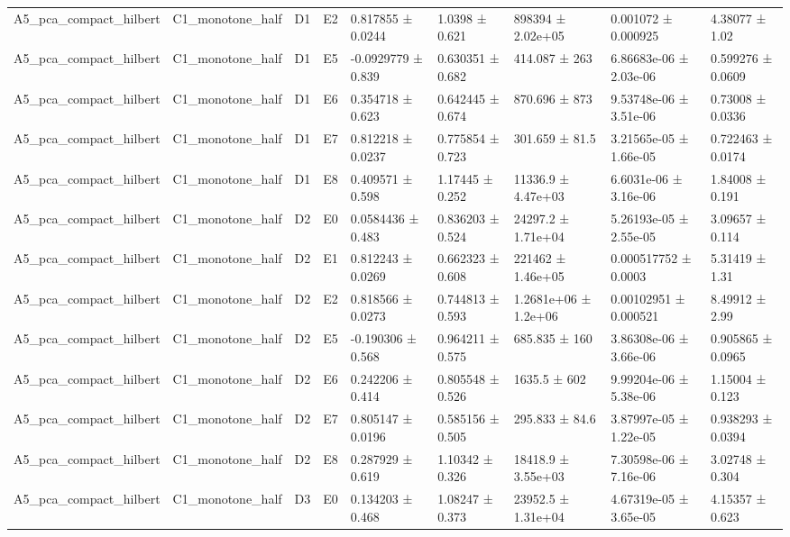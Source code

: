 \begin{table}
\begin{tabular}{lllllllll}
A5\_pca\_compact\_hilbert & C1\_monotone\_half & D1 & E2 & 0.817855 ± 0.0244 & 1.0398 ± 0.621 & 898394 ± 2.02e+05 & 0.001072 ± 0.000925 & 4.38077 ± 1.02 \\
A5\_pca\_compact\_hilbert & C1\_monotone\_half & D1 & E5 & -0.0929779 ± 0.839 & 0.630351 ± 0.682 & 414.087 ± 263 & 6.86683e-06 ± 2.03e-06 & 0.599276 ± 0.0609 \\
A5\_pca\_compact\_hilbert & C1\_monotone\_half & D1 & E6 & 0.354718 ± 0.623 & 0.642445 ± 0.674 & 870.696 ± 873 & 9.53748e-06 ± 3.51e-06 & 0.73008 ± 0.0336 \\
A5\_pca\_compact\_hilbert & C1\_monotone\_half & D1 & E7 & 0.812218 ± 0.0237 & 0.775854 ± 0.723 & 301.659 ± 81.5 & 3.21565e-05 ± 1.66e-05 & 0.722463 ± 0.0174 \\
A5\_pca\_compact\_hilbert & C1\_monotone\_half & D1 & E8 & 0.409571 ± 0.598 & 1.17445 ± 0.252 & 11336.9 ± 4.47e+03 & 6.6031e-06 ± 3.16e-06 & 1.84008 ± 0.191 \\
A5\_pca\_compact\_hilbert & C1\_monotone\_half & D2 & E0 & 0.0584436 ± 0.483 & 0.836203 ± 0.524 & 24297.2 ± 1.71e+04 & 5.26193e-05 ± 2.55e-05 & 3.09657 ± 0.114 \\
A5\_pca\_compact\_hilbert & C1\_monotone\_half & D2 & E1 & 0.812243 ± 0.0269 & 0.662323 ± 0.608 & 221462 ± 1.46e+05 & 0.000517752 ± 0.0003 & 5.31419 ± 1.31 \\
A5\_pca\_compact\_hilbert & C1\_monotone\_half & D2 & E2 & 0.818566 ± 0.0273 & 0.744813 ± 0.593 & 1.2681e+06 ± 1.2e+06 & 0.00102951 ± 0.000521 & 8.49912 ± 2.99 \\
A5\_pca\_compact\_hilbert & C1\_monotone\_half & D2 & E5 & -0.190306 ± 0.568 & 0.964211 ± 0.575 & 685.835 ± 160 & 3.86308e-06 ± 3.66e-06 & 0.905865 ± 0.0965 \\
A5\_pca\_compact\_hilbert & C1\_monotone\_half & D2 & E6 & 0.242206 ± 0.414 & 0.805548 ± 0.526 & 1635.5 ± 602 & 9.99204e-06 ± 5.38e-06 & 1.15004 ± 0.123 \\
A5\_pca\_compact\_hilbert & C1\_monotone\_half & D2 & E7 & 0.805147 ± 0.0196 & 0.585156 ± 0.505 & 295.833 ± 84.6 & 3.87997e-05 ± 1.22e-05 & 0.938293 ± 0.0394 \\
A5\_pca\_compact\_hilbert & C1\_monotone\_half & D2 & E8 & 0.287929 ± 0.619 & 1.10342 ± 0.326 & 18418.9 ± 3.55e+03 & 7.30598e-06 ± 7.16e-06 & 3.02748 ± 0.304 \\
A5\_pca\_compact\_hilbert & C1\_monotone\_half & D3 & E0 & 0.134203 ± 0.468 & 1.08247 ± 0.373 & 23952.5 ± 1.31e+04 & 4.67319e-05 ± 3.65e-05 & 4.15357 ± 0.623 \\

\end{tabular}
\end{table}
